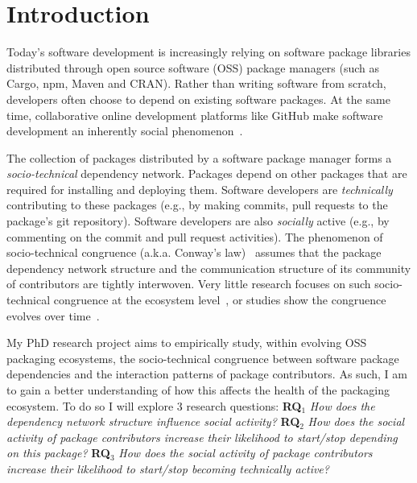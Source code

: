 \section{Introduction}
\label{sec:intro}

Today's software development is increasingly relying on software package libraries distributed through open source software (OSS) package managers (such as Cargo, npm, Maven and CRAN). Rather than writing software from scratch, developers often choose to depend on existing software packages.
At the same time, collaborative online development platforms like GitHub make software development an inherently social phenomenon~\cite{DabbishSTH12,Mens2019IEEESW}.

The collection of packages distributed by a software package manager forms a \emph{socio-technical} dependency network. Packages depend on other packages that are required for installing and deploying them. Software developers are \emph{technically} contributing to these packages (e.g., by making commits, pull requests to the package's git repository). Software developers are also \emph{socially} active (e.g., by commenting on the commit and pull request activities).
The phenomenon of socio-technical congruence (a.k.a. Conway's law)~\cite{Conway1968, Herbsleb1999} assumes
that the package dependency network structure and the communication structure of its community of contributors are tightly interwoven. Very little research focuses on such socio-technical congruence at the ecosystem level~\cite{Palyart2018TSE}, or studies show the congruence evolves over time~\cite{Cataldo2008}.

My PhD research project %
aims to empirically study, within evolving OSS packaging ecosystems, the socio-technical congruence between software package dependencies and the interaction patterns of package contributors. As such, I am to gain a better understanding of how this affects the health of the packaging ecosystem.
To do so %
I will explore 3 research questions: 
%
\textbf{RQ$_1$} \emph{How does the dependency network structure influence social activity?} %
 \textbf{RQ$_2$} \emph{How does the social activity of package contributors increase their likelihood to start/stop depending on this package?}
\textbf{RQ$_3$} \emph{How does the social activity of package contributors increase their likelihood to start/stop becoming technically active?}


